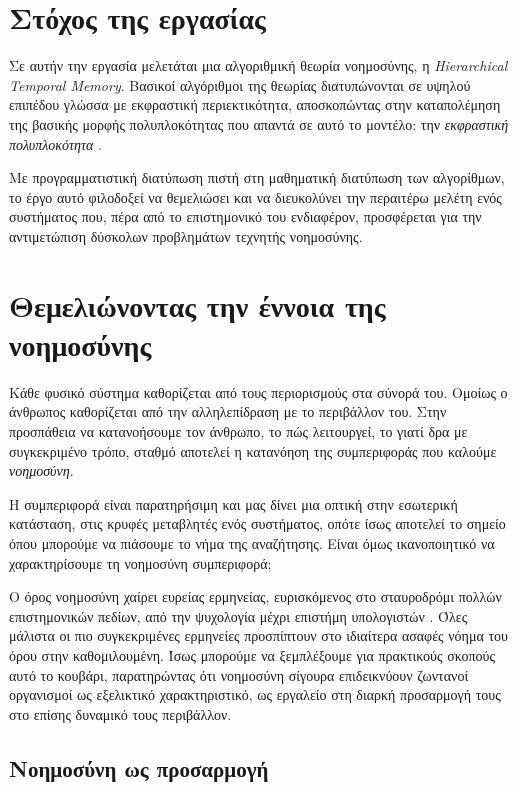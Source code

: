 \section{Στόχος της εργασίας}

  Σε αυτήν την εργασία μελετάται μια αλγοριθμική θεωρία νοημοσύνης, η \textit{Hierarchical Temporal Memory}. Βασικοί αλγόριθμοι της θεωρίας
  διατυπώνονται σε υψηλού επιπέδου γλώσσα με εκφραστική περιεκτικότητα, αποσκοπώντας στην καταπολέμηση της βασικής μορφής
  πολυπλοκότητας που απαντά σε αυτό το μοντέλο: την \textit{εκφραστική πολυπλοκότητα} \parencite{chazelleNaturalAlgorithmsInfluence}.

  Με προγραμματιστική διατύπωση πιστή στη μαθηματική διατύπωση των αλγορίθμων, το έργο αυτό φιλοδοξεί να θεμελιώσει και να
  διευκολύνει την περαιτέρω μελέτη ενός συστήματος που, πέρα από το επιστημονικό του ενδιαφέρον,
  προσφέρεται για την αντιμετώπιση δύσκολων προβλημάτων τεχνητής νοημοσύνης.

\section{Θεμελιώνοντας την έννοια της νοημοσύνης}

  Κάθε φυσικό σύστημα καθορίζεται από τους περιορισμούς στα σύνορά του.
  Ομοίως ο άνθρωπος καθορίζεται από την αλληλεπίδραση με το περιβάλλον του.
  Στην προσπάθεια να κατανοήσουμε τον άνθρωπο, το πώς λειτουργεί, το γιατί δρα με συγκεκριμένο τρόπο,
  σταθμό αποτελεί η κατανόηση της συμπεριφοράς που καλούμε \textit{νοημοσύνη}.

  Η συμπεριφορά είναι παρατηρήσιμη και μας δίνει μια οπτική στην εσωτερική κατάσταση, στις κρυφές μεταβλητές ενός συστήματος,
  οπότε ίσως αποτελεί το σημείο όπου μπορούμε να πιάσουμε το νήμα της αναζήτησης.
  Είναι όμως ικανοποιητικό να χαρακτηρίσουμε τη νοημοσύνη συμπεριφορά;

  Ο όρος νοημοσύνη χαίρει ευρείας ερμηνείας, ευρισκόμενος στο σταυροδρόμι πολλών επιστημονικών πεδίων, από την ψυχολογία μέχρι επιστήμη υπολογιστών
  \parencite{leggCollectionDefinitionsIntelligence2007}.
  Όλες μάλιστα οι πιο συγκεκριμένες ερμηνείες προσπίπτουν στο ιδιαίτερα ασαφές νόημα του όρου στην καθομιλουμένη.
  Ίσως μπορούμε να ξεμπλέξουμε για πρακτικούς σκοπούς αυτό το κουβάρι, παρατηρώντας ότι νοημοσύνη σίγουρα επιδεικνύουν ζωντανοί οργανισμοί ως εξελικτικό χαρακτηριστικό,
  ως εργαλείο στη διαρκή προσαρμογή τους στο επίσης δυναμικό τους περιβάλλον.

\subsection*{Νοημοσύνη ως προσαρμογή}

